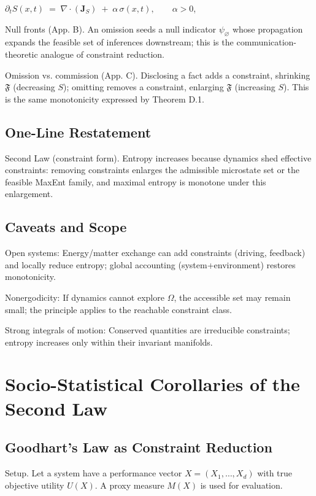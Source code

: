 \documentclass{article}
\begin{document}
$\partial_t S(x,t) \;=\; \nabla\!\cdot\!(\mathbf{J}_S) \;+\; \alpha\,\sigma(x,t), \qquad \alpha>0$,

Null fronts (App. B). An omission seeds a null indicator $\psi_{\varnothing}$ whose propagation expands the feasible set of inferences downstream; this is the communication-theoretic analogue of constraint reduction.

Omission vs. commission (App. C). Disclosing a fact adds a constraint, shrinking $\mathfrak{F}$ (decreasing $S$); omitting removes a constraint, enlarging $\mathfrak{F}$ (increasing $S$). This is the same monotonicity expressed by Theorem D.1.

\subsection{One-Line Restatement}

Second Law (constraint form). Entropy increases because dynamics shed effective constraints: removing constraints enlarges the admissible microstate set or the feasible MaxEnt family, and maximal entropy is monotone under this enlargement.

\subsection{Caveats and Scope}

Open systems: Energy/matter exchange can add constraints (driving, feedback) and locally reduce entropy; global accounting (system+environment) restores monotonicity.

Nonergodicity: If dynamics cannot explore $\Omega$, the accessible set may remain small; the principle applies to the reachable constraint class.

Strong integrals of motion: Conserved quantities are irreducible constraints; entropy increases only within their invariant manifolds.

\section{Socio-Statistical Corollaries of the Second Law} \label{app:E}

\subsection{Goodhart’s Law as Constraint Reduction}

Setup.
Let a system have a performance vector $X=(X_1,\dots,X_d)$ with true objective utility $U(X)$. A proxy measure $M(X)$ is used for evaluation.
\end{document}
